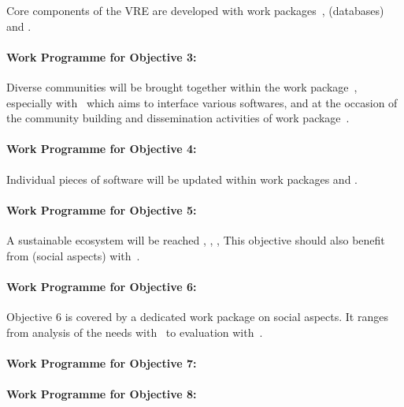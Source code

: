 \documentclass[noworkareas,deliverables,\classoptions]{euproposal}       %
\begin{document}
\begin{proposal}
Core components of the VRE are developed with work packages~,
  (databases) and .

\paragraph{Work Programme for Objective 3: }

Diverse communities will be brought together within the work
package~, especially
with~ which aims to
interface various softwares, and at the occasion of the community
building and dissemination activities of work package~.

\paragraph{Work Programme for Objective 4: }

Individual pieces of software will be updated within work packages  and .

\paragraph{Work Programme for Objective 5: }

A sustainable ecosystem will be reached
, , ,  
This objective should also benefit from  (social aspects) with~.

\paragraph{Work Programme for Objective 6: }

Objective 6 is covered by a dedicated work package  on social aspects.
It ranges from analysis of the needs with~ to
evaluation with~.

\paragraph{Work Programme for Objective 7: }


\paragraph{Work Programme for Objective 8: }


\end{proposal}
\end{document}
